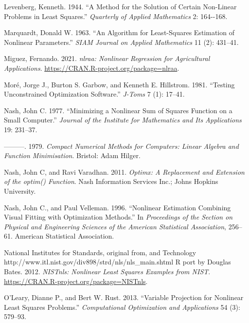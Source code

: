 \documentclass[
]{article}
\newlength{\cslhangindent}
\newlength{\cslentryspacingunit} %
\newenvironment{CSLReferences}[2] %
 {%
  \setlength{\parindent}{0pt}
  \ifodd #1
  \let\oldpar\par
  \def\par{\hangindent=\cslhangindent\oldpar}
  \fi
  \setlength{\parskip}{#2\cslentryspacingunit}
 }%
 {}
\begin{document}
\begin{CSLReferences}{1}{0}
\leavevmode{}%
Levenberg, Kenneth. 1944. {``A Method for the Solution of Certain
Non-Linear Problems in Least Squares.''} \emph{Quarterly of Applied
Mathematics} 2: 164-\/-168.

\leavevmode{}%
Marquardt, Donald W. 1963. {``{An Algorithm for Least-Squares Estimation
of Nonlinear Parameters}.''} \emph{SIAM Journal on Applied Mathematics}
11 (2): 431--41.

\leavevmode{}%
Miguez, Fernando. 2021. \emph{{nlraa: Nonlinear Regression for
Agricultural Applications}}.
\url{https://CRAN.R-project.org/package=nlraa}.

\leavevmode{}%
Moré, Jorge J., Burton S. Garbow, and Kenneth E. Hillstrom. 1981.
{``Testing Unconstrained Optimization Software.''} \emph{J-Toms} 7 (1):
17--41.

\leavevmode{}%
Nash, John C. 1977. {``Minimizing a Nonlinear Sum of Squares Function on
a Small Computer.''} \emph{Journal of the Institute for Mathematics and
Its Applications} 19: 231--37.

\leavevmode{}%
---------. 1979. \emph{Compact Numerical Methods for Computers: Linear
Algebra and Function Minimisation}. Bristol: Adam Hilger.

\leavevmode{}%
Nash, John C, and Ravi Varadhan. 2011. \emph{\emph{Optimx}: A
Replacement and Extension of the {optim()} Function}. Nash Information
Services Inc.; Johns Hopkins University.

\leavevmode{}%
Nash, John C., and Paul Velleman. 1996. {``Nonlinear Estimation
Combining Visual Fitting with Optimization Methods.''} In
\emph{Proceedings of the Section on Physical and Engineering Sciences of
the American Statistical Association}, 256--61. American Statistical
Association.

\leavevmode{}%
National Institutes for Standards, original from, and Technology
http://www.itl.nist.gov/div898/strd/nls/nls\_main.shtml R port by
Douglas Bates. 2012. \emph{NISTnls: Nonlinear Least Squares Examples
from NIST}. \url{https://CRAN.R-project.org/package=NISTnls}.

\leavevmode{}%
O'Leary, Dianne P., and Bert W. Rust. 2013. {``Variable Projection for
Nonlinear Least Squares Problems.''} \emph{Computational Optimization
and Applications} 54 (3): 579--93.


\end{CSLReferences}
\end{document}
